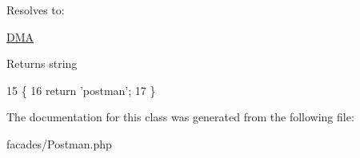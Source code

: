Resolves to\+:
\begin{DoxyItemize}
\item \hyperlink{namespaceDMA}{D\+M\+A}
\end{DoxyItemize}

\begin{DoxyReturn}{Returns}
string 
\end{DoxyReturn}

\begin{DoxyCode}
15                                                  \{ 
16         \textcolor{keywordflow}{return} \textcolor{stringliteral}{'postman'};
17     \}
\end{DoxyCode}


The documentation for this class was generated from the following file\+:\begin{DoxyCompactItemize}
\item 
facades/Postman.\+php\end{DoxyCompactItemize}
